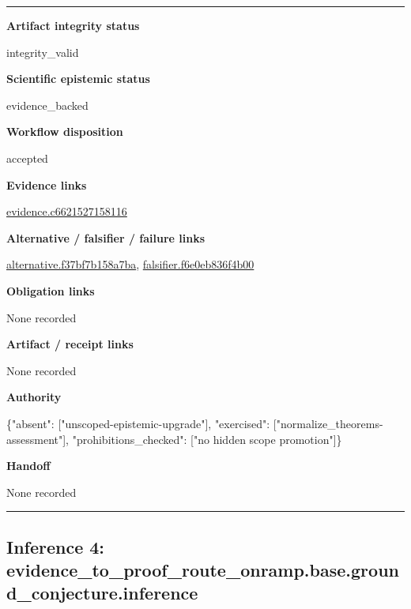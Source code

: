\documentclass[10pt,a4paper]{article}
\newcommand{\TraceField}[2]{\par\noindent\textbf{#1}\par\noindent #2\par\smallskip}
\newenvironment{TraceDossier}{\par\medskip\noindent\hrule\medskip}{\medskip\hrule\par\medskip}
\begin{document}
\begin{TraceDossier}
\TraceField{Artifact integrity status}{integrity\_\allowbreak{}valid}

\TraceField{Scientific epistemic status}{evidence\_\allowbreak{}backed}

\TraceField{Workflow disposition}{accepted}

\TraceField{Evidence links}{\hyperlink{trace-evidence-1104de47be60a4c5d6}{evidence.\allowbreak{}c662152715\allowbreak{}8116}}

\TraceField{Alternative / falsifier / failure links}{\hyperlink{trace-alternative-d02000e9d7678e4fb6}{alternativ\allowbreak{}e.\allowbreak{}f37bf7b158\allowbreak{}a7ba}, \hyperlink{trace-alternative-8eda0e3af99ae34385}{falsifier.\allowbreak{}f6e0eb836f\allowbreak{}4b00}}

\TraceField{Obligation links}{None recorded}

\TraceField{Artifact / receipt links}{None recorded}

\TraceField{Authority}{\{"absent":\allowbreak{} ["unscoped\allowbreak{}-\allowbreak{}epistemic-\allowbreak{}upgrade"],\allowbreak{} "exercised\allowbreak{}":\allowbreak{} ["normaliz\allowbreak{}e\_\allowbreak{}theorems-\allowbreak{}assessment\allowbreak{}"], "prohibiti\allowbreak{}ons\_\allowbreak{}checked":\allowbreak{} ["no hidden scope promotion"\allowbreak{}]\}}

\TraceField{Handoff}{None recorded}

\end{TraceDossier}
\pagebreak[2]\subsection{Inference 4: evidence\_\allowbreak{}to\_\allowbreak{}proof\_\allowbreak{}route\_\allowbreak{}onramp.\allowbreak{}base.\allowbreak{}ground\_\allowbreak{}conjecture\allowbreak{}.\allowbreak{}inference}\label{trace-inference-9c1af679b863f5e0ca}
\end{document}
